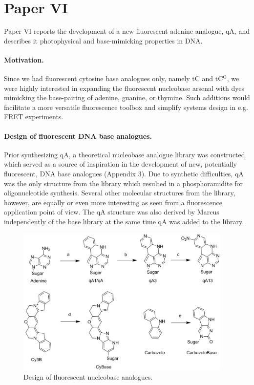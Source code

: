 \section{Paper VI}
 Paper VI reports the development of a new fluorescent adenine analogue, qA, and describes it photophysical and base-mimicking properties in DNA.

 \paragraph{Motivation.} Since we had fluorescent cytosine base analogues only, namely tC and tC$^\mathrm{O}$, we were highly interested in expanding the fluorescent nucleobase arsenal with dyes mimicking the base-pairing of adenine, guanine, or thymine. Such additions would facilitate a more versatile fluorescence toolbox and simplify systems design in e.g. FRET experiments.

 \paragraph{Design of fluorescent DNA base analogues.} Prior synthesizing qA, a theoretical nucleobase analogue library was constructed which served as a source of inspiration in the development of new, potentially fluorescent, DNA base analogues (Appendix 3). Due to synthetic difficulties, qA was the only structure from the library which resulted in a phosphoramidite for oligonucleotide synthesis. Several other molecular structures from the library, however, are equally or even more interesting as seen from a fluorescence application point of view. The qA structure was also derived by Marcus independently of the base library at the same time qA was added to the library.

\begin{figure}
    \centering
        \includegraphics[width=0.95\textwidth]{adds//cej_fig2.png}
    \captionsetup{width=.95\textwidth}
    \caption{Design of fluorescent nucleobase analogues.}
    \label{Fig:chap_Papers_CEJ2}
\end{figure}


